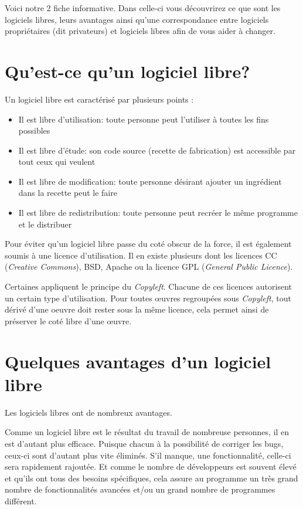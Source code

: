 \documentclass[10pt]{../fiche}
\begin{document}

\vspace*{0.5cm} Voici notre 2 fiche informative. Dans celle-ci vous
découvrirez ce que sont les logiciels libres, leurs avantages ainsi qu'une
correspondance entre logiciels propriétaires (dit privateurs) et logiciels
libres afin de vous aider à changer.

\section*{Qu'est-ce qu'un logiciel libre?}

Un logiciel libre est caractérisé par plusieurs points :
\begin{itemize}
\item Il est libre d'utilisation: toute personne peut l'utiliser à toutes les fins possibles
\item Il est libre d'étude: son code source (recette de fabrication) est accessible par tout ceux qui veulent
\item Il est libre de modification: toute personne désirant ajouter un ingrédient dans la recette peut le faire
\item Il est libre de redistribution: toute personne peut recréer le même programme et le distribuer
\end{itemize}

Pour éviter qu'un logiciel libre passe du coté obscur de la force, il est
également soumis à une licence d'utilisation. Il en existe plusieurs dont les
licences CC (\textit{Creative Commons}), BSD, Apache ou la licence GPL (\textit{General
Public Licence}).

Certaines appliquent le principe du \textit{Copyleft}. Chacune de ces licences
autorisent un certain type d'utilisation. Pour toutes œuvres regroupées sous
\textit{Copyleft}, tout dérivé d'une oeuvre doit rester sous la même licence,
cela permet ainsi de préserver le coté libre d'une œuvre.

\section*{Quelques avantages d'un logiciel libre}

Les logiciels libres ont de nombreux avantages.

Comme un logiciel libre est le résultat du travail de nombreuse personnes, il
en est d'autant plus efficace. Puisque chacun à la possibilité de corriger les
bugs, ceux-ci sont d'autant plus vite éliminés. S'il manque, une
fonctionnalité, celle-ci sera rapidement rajoutée. Et comme le nombre de
développeurs est souvent élevé et qu'ils ont tous des besoins spécifiques, cela
assure au programme un très grand nombre de fonctionnalités avancées et/ou un
grand nombre de programmes différent.
\end{document}
